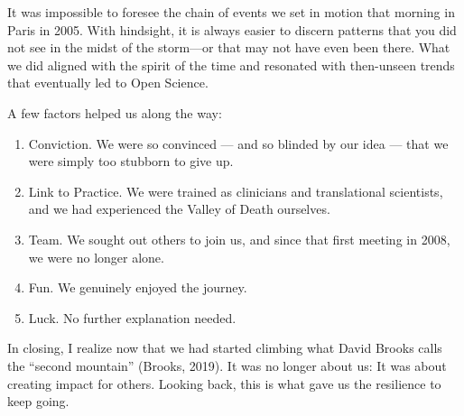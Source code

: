 \documentclass[authordate, editorial]{jote-new-article}
\begin{document}
	It was impossible to foresee the chain of events we set in motion that morning in Paris in 2005. With hindsight, it is always easier to discern patterns that you did not see in the midst of the storm—or that may not have even been there. What we did aligned with the spirit of the time and resonated with then-unseen trends that eventually led to Open Science.



	A few factors helped us along the way:





	\begin{enumerate}


		\item Conviction. We were so convinced — and so blinded by our idea — that we were simply too stubborn to give up.



		\item
		Link to Practice. We were trained as clinicians and translational scientists, and we had experienced the Valley of Death ourselves.



		\item Team. We sought out others to join us, and since that first meeting in 2008, we were no longer alone.



		\item Fun. We genuinely enjoyed the journey.



		\item Luck. No further explanation needed.


	\end{enumerate}





	In closing, I realize now that we had started climbing what David Brooks calls the “second mountain” (Brooks, 2019). It was no longer about us: It was about creating impact for others. Looking back, this is what gave us the resilience to keep going.
\end{document}
